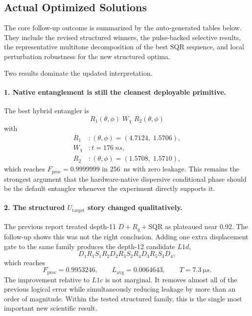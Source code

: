 \documentclass[11pt, a4paper]{article}
\begin{document}
\subsection{Actual Optimized Solutions}

The core follow-up outcome is summarized by the auto-generated tables below. They include the revised structured winners, the pulse-backed selective results, the representative multitone decomposition of the best SQR sequence, and local perturbation robustness for the new structured optima.



Two results dominate the updated interpretation.

\paragraph{1. Native entanglement is still the cleanest deployable primitive.}
The best hybrid entangler is
\begin{equation}
R_1(\theta,\phi)\;W_{\chi}\;R_2(\theta,\phi)
\end{equation}
with
\begin{align}
R_1 &: (\theta,\phi) = (4.7124,\;1.5706), \nonumber\\
W_{\chi} &: t = \SI{176}{ns}, \nonumber\\
R_2 &: (\theta,\phi) = (1.5708,\;1.5710), \nonumber
\end{align}
which reaches $F_{\mathrm{proc}} = 0.9999999$ in \SI{256}{ns} with zero leakage. This remains the strongest argument that the hardware-native dispersive conditional phase should be the default entangler whenever the experiment directly supports it.

\paragraph{2. The structured $U_{\mathrm{target}}$ story changed qualitatively.}
The previous report treated depth-11 $D+R_q+\mathrm{SQR}$ as plateaued near $0.92$. The follow-up shows this was not the right conclusion. Adding one extra displacement gate to the same family produces the depth-12 candidate $L1d$,
\begin{equation}
D_1 R_1 S_1 R_2 D_2 R_3 S_2 R_4 D_3 R_5 S_3 D_4,
\end{equation}
which reaches
\begin{equation}
F_{\mathrm{proc}} = 0.9953246,\qquad
L_{\mathrm{avg}} = 0.0064643,\qquad
T = \SI{7.3}{\micro s}.
\end{equation}
The improvement relative to $L1c$ is not marginal. It removes almost all of the previous logical error while simultaneously reducing leakage by more than an order of magnitude. Within the tested structured family, this is the single most important new scientific result.
\end{document}
